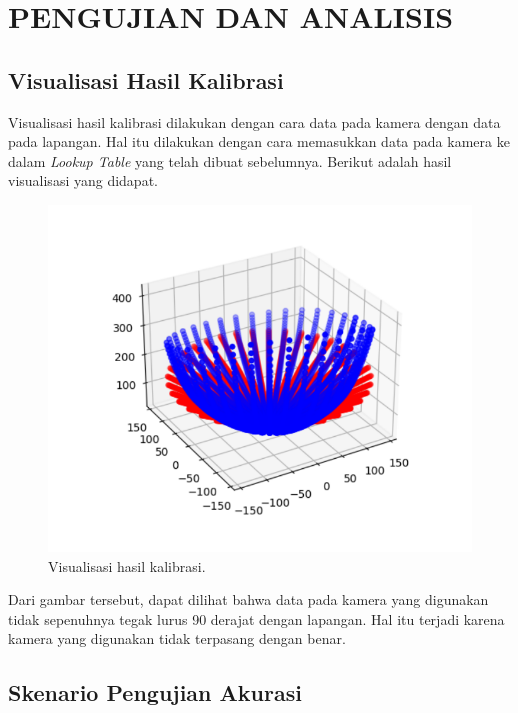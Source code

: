 \chapter{PENGUJIAN DAN ANALISIS}
\label{chap:pengujiananalisis}


\section{Visualisasi Hasil Kalibrasi}
\label{sec:visualisasihasil} 

Visualisasi hasil kalibrasi dilakukan dengan cara data pada kamera dengan data pada lapangan. Hal itu dilakukan dengan cara memasukkan data pada kamera ke dalam \emph{Lookup Table} yang telah dibuat sebelumnya. Berikut adalah hasil visualisasi yang didapat. 

\begin{figure}[H]
  \centering
  \includegraphics[scale=0.9]{gambar/visual1.png}
  \caption{Visualisasi hasil kalibrasi.}
  \label{fig:hasilkalibrasi}
\end{figure}

Dari gambar tersebut, dapat dilihat bahwa data pada kamera yang digunakan tidak sepenuhnya tegak lurus 90 derajat dengan lapangan. Hal itu terjadi karena kamera yang digunakan tidak terpasang dengan benar. 

\section{Skenario Pengujian Akurasi}
\label{sec:skenariopengujian}

